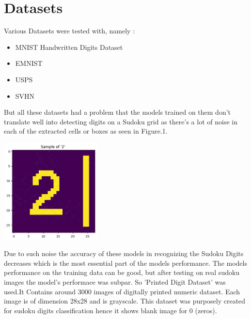 \begin{minipage}[t]{0.6\textwidth}
    \section{Datasets}
    Various Datasets were tested with, namely : 
    \begin{itemize}
        \item MNIST Handwritten Digits Dataset
        \item EMNIST
        \item USPS
        \item SVHN
    \end{itemize}
    But all these datasets had a problem that the models trained on them don't translate well into detecting digits on a Sudoku grid as there's a lot of noise in each of the extracted cells or boxes as seen in Figure.1.
    \begin{center}
        \includegraphics[width=2in]{2.png}
        \label{fig:figure_label}
    \end{center}
    Due to such noise the accuracy of these models in recognizing the Sudoku Digits decreases which is the most essential part of the models performance. The models performance on the training data can be good, but after testing on real sudoku images the model's performace was subpar.
    So 'Printed Digit Dataset' was used.It Contains around 3000 images of digitally printed numeric dataset.
    Each image is of dimension 28x28 and is grayscale. This dataset was purposely created for sudoku digits classification hence it shows blank image for 0 (zeros).

\end{minipage}




